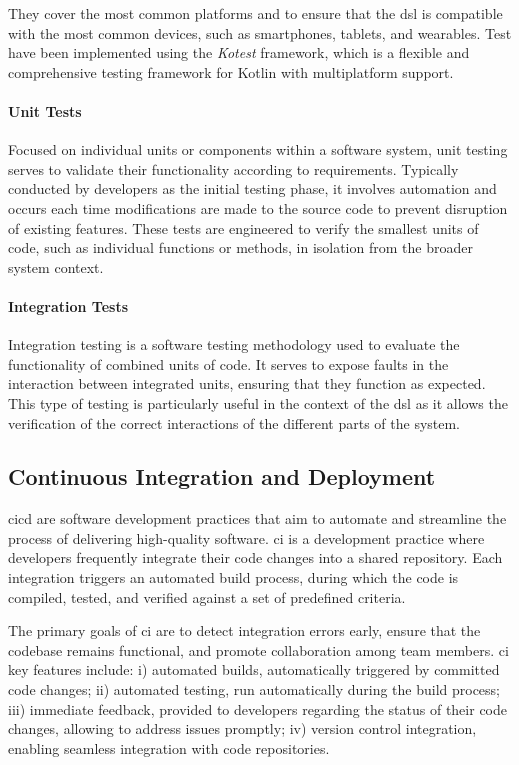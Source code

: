 They cover the most common platforms and to ensure that the \ac{dsl} is compatible with the most common
devices, such as smartphones, tablets, and wearables.
Test have been implemented using the \emph{Kotest} framework, which is a flexible and comprehensive testing framework for Kotlin
with multiplatform support.

\paragraph{Unit Tests}
Focused on individual units or components within a software system, unit testing serves to validate their functionality
according to requirements.
Typically conducted by developers as the initial testing phase, it involves automation and occurs each time modifications
are made to the source code to prevent disruption of existing features.
These tests are engineered to verify the smallest units of code, such as individual functions or methods, in isolation
from the broader system context.

\paragraph{Integration Tests}
Integration testing is a software testing methodology used to evaluate the functionality of combined units of code.
It serves to expose faults in the interaction between integrated units, ensuring that they function as expected.
This type of testing is particularly useful in the context of the \ac{dsl} as it allows the verification of the correct
interactions of the different parts of the system.

\subsection{Continuous Integration and Deployment}
\label{subsec:continuous-integration-and-deployment}
\ac{cicd} are software development practices that aim to automate and streamline the process of delivering high-quality software.
\ac{ci} is a development practice where developers frequently integrate their code changes into a shared repository.
Each integration triggers an automated build process, during which the code is compiled, tested, and verified against a
set of predefined criteria.

The primary goals of \ac{ci} are to detect integration errors early, ensure that the codebase remains functional,
and promote collaboration among team members.
\ac{ci} key features include:
    i) automated builds, automatically triggered by committed code changes;
    ii) automated testing, run automatically during the build process;
    iii) immediate feedback, provided to developers regarding the status of their code changes, allowing to address issues promptly;
    iv) version control integration, enabling seamless integration with code repositories.

